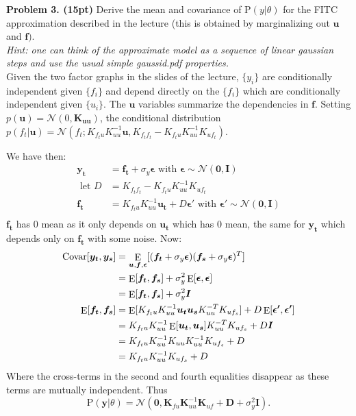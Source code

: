 \documentclass[12pt]{article}
\DeclareMathOperator*{\E}{\rm E}
\newcommand{\p}{\mathrm{P}}
\newcommand{\vect}[1]{\bm{#1}} %
\newcommand{\matr}[1]{\bm{#1}} %
\newcommand{\Covar}{\mathrm{Covar}}
\begin{document}
\noindent \textbf{Problem 3. (15pt)} 
Derive the mean and covariance of  $\mathrm{P}(y|\theta)$ for the FITC approximation described in the lecture (this is obtained by marginalizing out $\mathbf{u}$ and $\mathbf{f})$.\\
\noindent \emph{Hint: one can think of the approximate model as a sequence of linear gaussian steps and use the usual simple gaussid.pdf properties.}\\

Given the two factor graphs in the slides of the lecture, $\{y_i\}$ are conditionally independent given  $\{f_i\}$  and depend directly on the $\{f_i\}$ which are conditionally independent  given $\{u_i\}$. 
The $\vect{u}$ variables summarize the dependencies in $\vect{f}$. Setting $p(\vect{u}) = \mathcal{N}(0,\matr{K_{uu}})$, 
the conditional distribution $p(f_t|\vect{u}) =  \mathcal{N}(f_t; K_{f_tu} K_{uu}^{-1} \vect{u}, K_{f_tf_t} -  K_{f_tu}  K_{uu}^{-1} K_{uf_t})$.

We have then:
\begin{align*}
	\vect{y_t}	&=	\vect{f_t} + \sigma_y \vect{\epsilon} \text{ with } \vect{\epsilon} \sim  \mathcal{N}(\vect{0},\vect{I}) \\
	\text{ let } D		&=	K_{f_tf_t} -  K_{f_tu}  K_{uu}^{-1} K_{uf_t} \\
	\vect{f_t}	&= 	 K_{f_tu} K_{uu}^{-1} \vect{u_t} + D \vect{\epsilon'} \text{ with } \vect{\epsilon'} \sim  \mathcal{N}(\vect{0},\vect{I}) \\
\end{align*}
$\vect{f_t}$ has 0 mean as it only depends on $\vect{u_t}$  which has 0 mean, the same for $\vect{y_t}$ which depends only on $\vect{f_t}$ with some noise.
Now:
\begin{align*}
	\Covar[\vect{y_t},\vect{y_s}]	&= \E_{\vect{u}, \vect{f}, \vect{\epsilon}}[(\vect{f_t} + \sigma_y \vect{\epsilon}) (\vect{f_s} + \sigma_y \vect{\epsilon})^T]	\\
							&= \E[\vect{f_t}, \vect{f_s}] + \sigma_y^2 \E[\vect{\epsilon}, \vect{\epsilon}] \\
							&= \E[\vect{f_t}, \vect{f_s}] +  \sigma_y^2 \vect{I} \\
	\E[\vect{f_t}, \vect{f_s}] 		&= \E[K_{f_tu} K_{uu}^{-1} \vect{u_t} \vect{u_s} K_{uu}^{-T}K_{uf_s}] + D \E[\vect{\epsilon'}, \vect{\epsilon'}] \\
							&= K_{f_tu} K_{uu}^{-1} \E[\vect{u_t}, \vect{u_s}]  K_{uu}^{-T}K_{uf_s} + D \vect{I} \\
							&=  K_{f_tu} K_{uu}^{-1} K_{uu}   K_{uu}^{-1} K_{uf_s} + D \\
							&= K_{f_tu} K_{uu}^{-1}   K_{uf_s} + D 
\end{align*}
Where the cross-terms in the second  and fourth equalities disappear as these terms are mutually independent.
Thus $$\p(\vect{y}|\theta) = \mathcal{N}\left( \mathbf{0},  \mathbf{K}_{fu} \mathbf{K}_{uu}^{-1}\mathbf{K}_{uf}  + \mathbf{D} + \sigma_y^2 \mathbf{I}\right).$$
\end{document}
